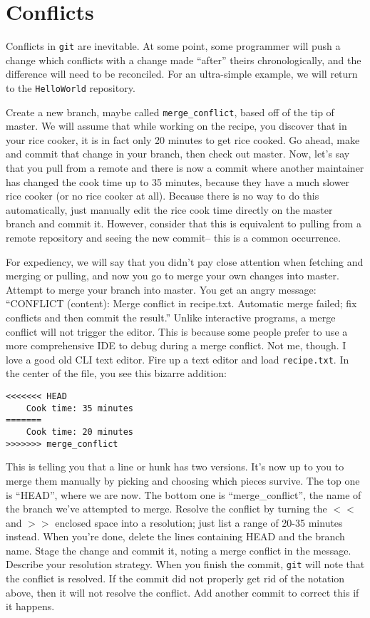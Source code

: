 {\section{Conflicts}
\par{
Conflicts in \verb+git+ are inevitable. At some point, some programmer will
push a change which conflicts with a change made ``after'' theirs
chronologically, and the difference will need to be reconciled. For an
ultra-simple example, we will return to the \verb+HelloWorld+ repository.
}

\par{
Create a new branch, maybe called \verb+merge_conflict+, based off of the tip
of master. We will assume that while working on the recipe, you discover that
in your rice cooker, it is in fact only 20 minutes to get rice cooked. Go
ahead, make and commit that change in your branch, then check out master. 
Now, let's say that you pull from a remote and there is now a commit where
another maintainer has changed the cook time up to 35 minutes, because they
have a much slower rice cooker (or no rice cooker at all). Because there is no
way to do this automatically, just manually edit the rice cook time directly
on the master branch and commit it. However, consider that this is equivalent
to pulling from a remote repository and seeing the new commit-- this is a
common occurrence. 
}

\par{
For expediency, we will say that you didn't pay close attention when fetching
and merging or pulling, and now you go to merge your own changes into master.
Attempt to merge your branch into master. You get an angry message:
``CONFLICT (content): Merge conflict in recipe.txt. Automatic merge failed;
fix conflicts and then commit the result.''
Unlike interactive programs, a merge conflict will not trigger the editor.
This is because some people prefer to use a more comprehensive IDE to debug
during a merge conflict. Not me, though. I love a good old CLI text editor.
Fire up a text editor and load \verb+recipe.txt+. 
In the center of the file, you see this bizarre addition: 
}

\begin{verbatim}
<<<<<<< HEAD
    Cook time: 35 minutes
=======
    Cook time: 20 minutes
>>>>>>> merge_conflict
\end{verbatim}

\par{
This is telling you that a line or hunk has two versions. It's now up to you
to merge them manually by picking and choosing which pieces survive. The top
one is ``HEAD'', where we are now. The bottom one is ``merge\_conflict'', the
name of the branch we've attempted to merge. Resolve the conflict by turning
the $<<$ and $>>$ enclosed space into a resolution; just list a range of 20-35
minutes instead. When you're done, delete the lines containing HEAD and the
branch name. Stage the change and commit it, noting a merge conflict in the
message. Describe your resolution strategy. When you finish the commit,
\verb+git+ will note that the conflict is resolved. If the commit did not
properly get rid of the notation above, then it will not resolve the conflict.
Add another commit to correct this if it happens.
}

}
